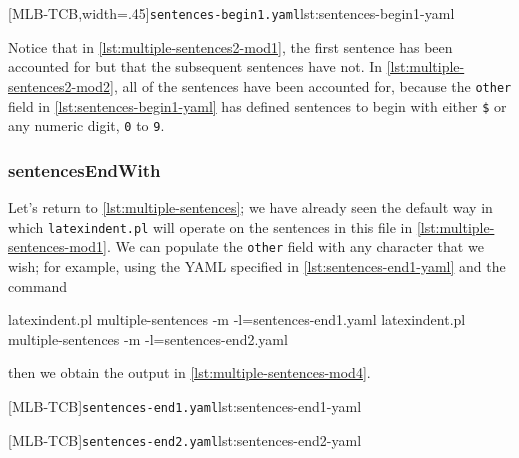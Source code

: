  \begin{cmhtcbraster}[
   raster force size=false,
   raster column 1/.style={add to width=1cm},
  ]
  [MLB-TCB,width=.45\textwidth]{\texttt{sentences-begin1.yaml}}{lst:sentences-begin1-yaml}
 \end{cmhtcbraster}
 Notice that in \cref{lst:multiple-sentences2-mod1}, the first sentence has been accounted
 for but that the subsequent sentences have not. In \cref{lst:multiple-sentences2-mod2},
 all of the sentences have been accounted for, because the \texttt{other} field in
 \cref{lst:sentences-begin1-yaml} has defined sentences to begin with either \lstinline!$!
 or any numeric digit, \texttt{0} to \texttt{9}.

\subsubsection{sentencesEndWith}
 Let's return to \vref{lst:multiple-sentences}; we have already seen the default way in
 which \texttt{latexindent.pl} will operate on the sentences in this file in
 \vref{lst:multiple-sentences-mod1}. We can populate the \texttt{other} field with any
 character that we wish; for example, using the YAML specified in
 \cref{lst:sentences-end1-yaml} and the command 
  
 \begin{commandshell}
latexindent.pl multiple-sentences -m -l=sentences-end1.yaml
latexindent.pl multiple-sentences -m -l=sentences-end2.yaml
\end{commandshell}
 then we obtain the output in \cref{lst:multiple-sentences-mod4}. 

 \begin{cmhtcbraster}
  [MLB-TCB]{\texttt{sentences-end1.yaml}}{lst:sentences-end1-yaml}
 \end{cmhtcbraster}

 \begin{cmhtcbraster}
  [MLB-TCB]{\texttt{sentences-end2.yaml}}{lst:sentences-end2-yaml}
 \end{cmhtcbraster}

